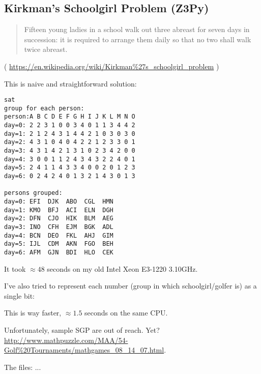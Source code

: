 \subsection{Kirkman's Schoolgirl Problem (Z3Py)}

\begin{framed}
\begin{quotation}

Fifteen young ladies in a school walk out three abreast for seven days in succession: it is required to arrange them daily so that no two shall walk twice abreast.

\end{quotation}
\end{framed}

( \url{https://en.wikipedia.org/wiki/Kirkman%27s_schoolgirl_problem} )

This is naive and straightforward solution:



\begin{lstlisting}
sat
group for each person:
person:A B C D E F G H I J K L M N O
day=0: 2 2 3 1 0 0 3 4 0 1 1 3 4 4 2
day=1: 2 1 2 4 3 1 4 4 2 1 0 3 0 3 0
day=2: 4 3 1 0 4 0 4 2 2 1 2 3 3 0 1
day=3: 4 3 1 4 2 1 3 1 0 2 3 4 2 0 0
day=4: 3 0 0 1 1 2 4 3 4 3 2 2 4 0 1
day=5: 2 4 1 1 4 3 3 4 0 0 2 0 1 2 3
day=6: 0 2 4 2 4 0 1 3 2 1 4 3 0 1 3

persons grouped:
day=0: EFI  DJK  ABO  CGL  HMN
day=1: KMO  BFJ  ACI  ELN  DGH
day=2: DFN  CJO  HIK  BLM  AEG
day=3: INO  CFH  EJM  BGK  ADL
day=4: BCN  DEO  FKL  AHJ  GIM
day=5: IJL  CDM  AKN  FGO  BEH
day=6: AFM  GJN  BDI  HLO  CEK
\end{lstlisting}

It took $\approx 48$ seconds on my old Intel Xeon E3-1220 3.10GHz.

I've also tried to represent each number (group in which schoolgirl/golfer is) as a single bit:



This is way faster, $\approx 1.5$ seconds on the same CPU.

Unfortunately, sample \ac{SGP} are out of reach. Yet?
\url{http://www.mathpuzzle.com/MAA/54-Golf%20Tournaments/mathgames_08_14_07.html}.

The files: ...

